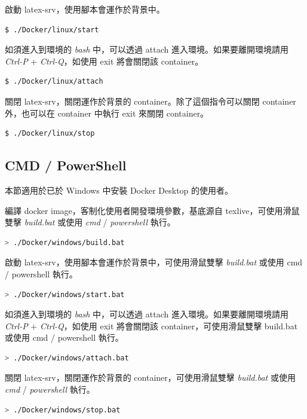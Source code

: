 啟動 latex-srv，使用腳本會運作於背景中。

\begin{lstlisting}[language=bash]
        $ ./Docker/linux/start
\end{lstlisting}

如須進入到環境的 \emph{bash} 中，可以透過 attach 進入環境。如果要離開環境請用 \emph{Ctrl-P} + \emph{Ctrl-Q}，如使用 exit 將會關閉該 container。
\begin{lstlisting}[language=bash] 
        $ ./Docker/linux/attach
\end{lstlisting}

關閉 latex-srv，關閉運作於背景的 container。除了這個指令可以關閉 container 外，也可以在 container 中執行 exit 來關閉 container。
\begin{lstlisting}[language=bash]
        $ ./Docker/linux/stop
\end{lstlisting}

\newpage

\subsection{CMD / PowerShell}

本節適用於已於 Windows 中安裝 Docker Desktop 的使用者。

編譯 docker image，客制化使用者開發環境參數，基底源自 texlive\cite{docker_texlive}，可使用滑鼠雙擊 \emph{build.bat} 或使用 \emph{cmd} / \emph{powershell} 執行。
\begin{lstlisting}[language=bash]
        > ./Docker/windows/build.bat
\end{lstlisting}

啟動 latex-srv，使用腳本會運作於背景中，可使用滑鼠雙擊 \emph{build.bat} 或使用 cmd / powershell 執行。
\begin{lstlisting}[language=bash]
        > ./Docker/windows/start.bat
\end{lstlisting}

如須進入到環境的 \emph{bash} 中，可以透過 attach 進入環境。如果要離開環境請用 \emph{Ctrl-P} + \emph{Ctrl-Q}，如使用 exit 將會關閉該 container，可使用滑鼠雙擊 build.bat 或使用 cmd / powershell 執行。
\begin{lstlisting}[language=bash]
        > ./Docker/windows/attach.bat
\end{lstlisting}

關閉 latex-srv，關閉運作於背景的 container，可使用滑鼠雙擊 \emph{build.bat} 或使用 \emph{cmd} / \emph{powershell} 執行。
\begin{lstlisting}[language=bash]
        > ./Docker/windows/stop.bat
\end{lstlisting}

